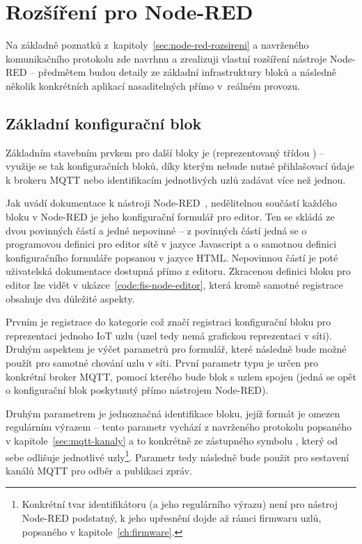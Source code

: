 \chapter{Rozšíření pro Node-RED}
\label{ch:rozsireni}

Na základně poznatků z~kapitoly~\ref{sec:node-red-rozsireni} a navrženého komunikačního protokolu zde navrhnu a
zrealizuji vlastní rozšíření nástroje Node-RED -- předmětem budou detaily ze základní infrastruktury bloků a
následně několik konkrétních
aplikací nasaditelných přímo v~reálném provozu.

\section{Základní konfigurační blok}\label{sec:zakladni-konfiguracni-blok}
Základním stavebním prvkem pro další bloky je  (reprezentovaný třídou ) -- využije se tak
konfiguračních bloků, díky kterým nebude nutné přihlašovací údaje k brokeru MQTT nebo identifikacím jednotlivých
uzlů zadávat více než jednou.

Jak uvádí dokumentace k nástroji Node-RED~\cite{NodeRedDocs}, nedělitelnou součástí každého bloku v Node-RED je jeho
konfigurační formulář pro editor.
Ten se skládá ze dvou povinných částí a jedné nepovinné -- z povinných částí jedná se o programovou definici pro editor
sítě v jazyce Javascript a o samotnou definici konfiguračního formuláře popsanou v jazyce HTML.
Nepovinnou částí je poté uživatelská dokumentace dostupná přímo z editoru.
Zkracenou definici bloku pro editor lze vidět v ukázce~\ref{code:fis-node-editor}, která kromě samotné registrace
obsahuje dva důležité aspekty.

Prvním je registrace do kategorie  což značí registraci konfigurační bloku pro reprezentaci jednoho IoT
uzlu (uzel tedy nemá grafickou reprezentaci v síti).
Druhým aspektem je výčet parametrů pro formulář, které následně bude možné použít pro samotné chování uzlu v síti.
První parametr typu  je určen pro konkrétní broker MQTT, pomocí kterého bude blok s uzlem spojen
(jedná se opět o konfigurační blok poskytnutý přímo nástrojem Node-RED).

Druhým parametrem je jednoznačná identifikace bloku, jejíž formát je omezen regulárním výrazem -- tento
parametr vychází z navrženého protokolu popsaného v kapitole~\ref{sec:mqtt-kanaly} a to
konkrétně ze zástupného symbolu , který od sebe odlišuje jednotlivé uzly\footnote{Konkrétní tvar
identifikátoru (a jeho regulárního výrazu) není pro nástroj Node-RED podstatný, k jeho upřesnění dojde až rámci
firmwaru uzlů, popsaného v kapitole~\ref{ch:firmware}.}.
Parametr  tedy následně bude použit pro sestavení kanálů MQTT pro odběr a publikaci zpráv.

